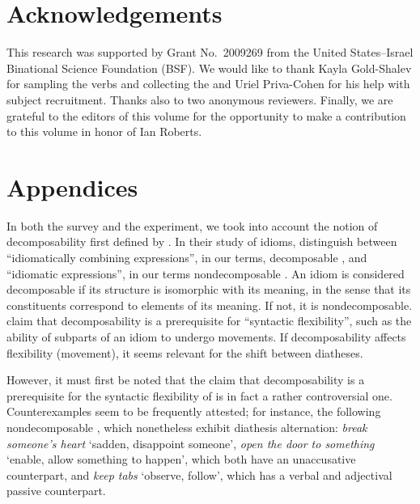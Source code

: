 \documentclass[output=paper]{langsci/langscibook}
\begin{document}

\section*{Acknowledgements}

This research was supported by Grant No.\ 2009269 from the United States–Israel
Binational Science Foundation (BSF). We would like to thank Kayla Gold-Shalev
for sampling the verbs and collecting the  and Uriel Priva-Cohen for his
help with subject recruitment. Thanks also to two anonymous reviewers. Finally,
we are grateful to the editors of this volume for the opportunity to make a
contribution to this volume in honor of Ian Roberts.

{\sloppy
\printbibliography[heading=subbibliography,notkeyword=this]
}

\section*{Appendices}

In both the survey and the experiment, we took into account the notion of
decomposability first defined by \textcite{NunSagWas1994}. In their study of
idioms, \citeauthor{NunSagWas1994} distinguish between ``idiomatically combining
expressions'', in our terms, decomposable , and ``idiomatic expressions'',
in our terms nondecomposable . An idiom is considered decomposable if its
structure is isomorphic with its meaning, in the sense that its constituents
correspond to elements of its meaning. If not, it is nondecomposable.
\textcite{NunSagWas1994} claim that decomposability is a prerequisite for
``syntactic flexibility'', such as the ability of subparts of an idiom to
undergo movements.  If decomposability affects flexibility (movement), it seems
relevant for the shift between diatheses.

However, it must first be noted that the claim that decomposability is a
prerequisite for the syntactic flexibility of  is in fact a rather
controversial one. Counterexamples seem to be frequently attested; for
instance, the following nondecomposable , which nonetheless exhibit
diathesis alternation: \emph{break someone’s heart} ‘sadden, disappoint
someone’, \emph{open the door to something} ‘enable, allow something to
happen', which both have an unaccusative counterpart, and \emph{keep tabs}
‘observe, follow’, which has a verbal and adjectival passive
counterpart.
\end{document}

